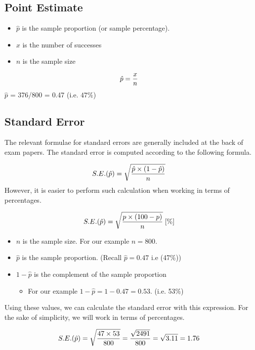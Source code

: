 \documentclass[]{report}
\begin{document}
\subsection*{Point Estimate}
\begin{itemize}
\item $\hat{p}$ is the sample proportion (or sample percentage).
\item $x$ is the number of successes
\item $n$ is the sample size 
\end{itemize}
\[ \hat{p} = { x \over n} \]
$\hat{p}$ = 376/800 = 0.47  (i.e. $47\%$)

\subsection*{Standard Error}
The relevant formulae for standard errors are generally included at the back of exam papers.
The standard error is computed according to the following formula.


\vspace{0.1cm}
\[
S.E. (\hat{p}) = \sqrt{ { \hat{p} \times ( 1 - \hat{p}) \over n}}
\]
However, it is easier to perform such calculation when working in terms of percentages.

\vspace{0.1cm}
\[
S.E. (\hat{p}) = \sqrt{ { p \times (100-p) \over n}}  \;[\%]
\]
\vspace{0.1cm}

\begin{itemize}
\item $n$ is the sample size. For our example $n = 800$.


\item $\hat{p}$ is the sample proportion.
(Recall $\hat{p} = 0.47$ i.e (47\%))


\item $1 - \hat{p}$ is the complement of the sample proportion \begin{itemize}
\item For our example $1- \hat{p} = 1 - 0.47 =  0.53$. (i.e. 53\%)
\end{itemize}
\end{itemize}



Using these values, we can calculate the standard error with this expression. For the sake of simplicity, we will work in terms of percentages.

\vspace{0.1cm}
\[
S.E. (\hat{p}) = \sqrt{ { 47 \times 53 \over 800}} = \frac{\sqrt{2491}}{800} = \sqrt{3.11} = 1.76
\]
\end{document}
